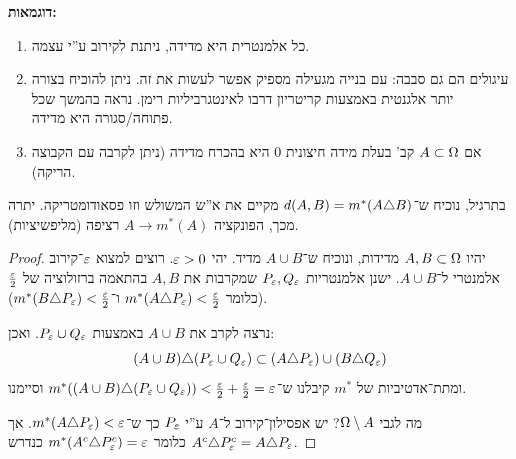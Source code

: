 \documentclass[name=רשימות פונקציות ממשיות – WIP]{../../../tex/classes/noChapterMegasumPreamble}
\begin{document}
	\textbf{דוגמאות: }\begin{enumerate}
		\item כל אלמנטרית היא מדידה, ניתנת לקירוב ע''י עצמה. 
		\item עיגולים הם גם סבבה: עם בנייה מגעילה מספיק אפשר לעשות את זה. ניתן להוכיח בצורה יותר אלגנטית באמצעות קריטריון דרבו לאינטגרביליות רימן. נראה בהמשך שכל פתוחה/סגורה היא מדידה. 
		\item אם $A \subset \Omega$ קב' בעלת מידה חיצונית $0$ היא בהכרח מדידה (ניתן לקרבה עם הקבוצה הריקה). 
	\end{enumerate}
	
	בתרגיל, נוכיח ש־$d(A, B) = m^*(A \triangle B)$ מקיים את א''ש המשולש וזו פסאודומטריקה. יתרה מכך, הפונקציה $A \to m^*(A)$ רציפה (מליפשיציות). 
	
	\begin{proof}
		יהיו $A, B \subset \Omega$ מדידות, ונוכיח ש־$A \cup B$ מדיד. יהי $\eg >0$. רוצים למצוא $\eg$־קירוב אלמנטרי ל־$A \cup B$. ישנן אלמנטריות $P_\eg, Q_\eg$ שמקרבות את $A, B$ בהתאמה ברזולוציה של $\frac{\eg}{2}$ (כלומר $m^*(A \trio P_\eg) < \frac{\eg}{2}$ ו־$m^*(B \trio P_\eg) < \frac{\eg}{2}$). 
		
		נרצה לקרב את $A \cup B$ באמצעות $P_\eg \cup Q_\eg$. ואכן: 
		\[ (A \cup B) \trio (P_\eg \cup Q_\eg) \subset (A \trio P_\eg) \cup (B \trio Q_\eg) \]
		ומתת־אדטיביות של $m^*$ קיבלנו ש־$m^*((A \cup B) \trio (P_\eg \cup Q_\eg)) < \frac{\eg}{2} + \frac{\eg}{2} = \eg$ וסיימנו. 
		
		מה לגבי $\Omega \setminus A$? יש אפסילון־קירוב ל־$A$ ע''י $P_\eg$ כך ש־$m^*(A \trio P_\eg) < \eg$. אך $A^c \trio P_\eg^c = A \trio P_\eg$ כלומר $m^*(A^c \trio P_\eg^c) = \eg$ כנדרש. 
	\end{proof}
	
\end{document}
